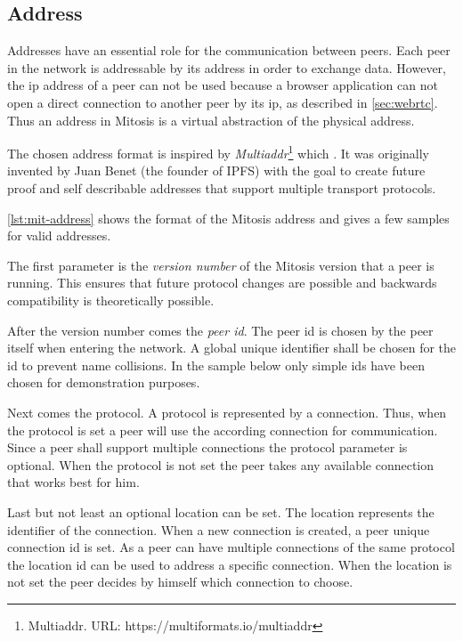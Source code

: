 \subsection{Address}\label{sec:mit-address}
Addresses have an essential role for the communication between peers. Each peer in the network is addressable by its address in order to exchange data. 
However, the \gls{ip} address of a peer can not be used because a browser application can not open a direct connection to another peer by its \gls{ip}, as described in \vref{sec:webrtc}. 
Thus an address in Mitosis is a virtual abstraction of the physical address. 

The chosen address format is inspired by \textit{Multiaddr}\footnote{Multiaddr. URL: {https://multiformats.io/multiaddr}} which \cite{multiaddr}. It was originally invented by Juan Benet (the founder of IPFS) with the goal to create future proof and self describable addresses that support multiple transport protocols. 

\vref{lst:mit-address} shows the format of the Mitosis address and gives a few samples for valid addresses.

The first parameter is the \textit{version number} of the Mitosis version that a peer is running. This ensures that future protocol changes are possible and backwards compatibility is theoretically possible.

After the version number comes the \textit{peer id}. The peer id is chosen by the peer itself when entering the network. A global unique identifier shall be chosen for the id to prevent name collisions. In the sample below only simple ids have been chosen for demonstration purposes. 

Next comes the protocol. A protocol is represented by a connection. Thus, when the protocol is set a peer will use the according connection for communication.
Since a peer shall support multiple connections the protocol parameter is optional. When the protocol is not set the peer takes any available connection that works best for him.

Last but not least an optional location can be set. The location represents the identifier of the connection. When a new connection is created, a peer unique connection id is set. As a peer can have multiple connections of the same protocol the location id can be used to address a specific connection. When the location is not set the peer decides by himself which connection to choose.

